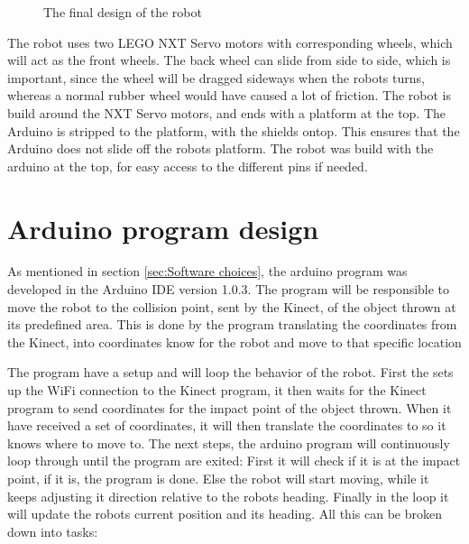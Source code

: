 \begin{figure}[h]
	\centering
	\caption{The final design of the robot}
	\label{robot}
\end{figure}

The robot uses two LEGO NXT Servo motors with corresponding wheels, which will act as the front wheels. The back wheel can slide from side to side, which is important, since the wheel will be dragged sideways when the robots turns, whereas a normal rubber wheel would have caused a lot of friction. 
The robot is build around the NXT Servo motors, and ends with a platform at the top. The Arduino is stripped to the platform, with the shields ontop. This ensures that the Arduino does not slide off the robots platform.
The robot was build with the arduino at the top, for easy access to the different pins if needed. 

\section{Arduino program design}
\label{sec:Arduino program design}
As mentioned in section \ref{sec:Software choices}, the arduino program was developed in the Arduino IDE version 1.0.3. The program will be responsible to move the robot to the collision point, sent by the Kinect, of the object thrown at its predefined area. This is done by the program translating the coordinates from the Kinect, into coordinates know for the robot and move to that specific location

The program have a setup and will loop the behavior of the robot. First the sets up the WiFi connection to the Kinect program, it then waits for the Kinect program to send coordinates for the impact point of the object thrown. When it have received a set of coordinates, it will then translate the coordinates to so it knows where to move to. The next steps, the arduino program will continuously loop through until the program are exited: First it will check if it is at the impact point, if it is, the program is done. Else the robot will start moving, while it keeps adjusting it direction relative to the robots heading. Finally in the loop it will update the robots current position and its heading. All this can be broken down into tasks:

